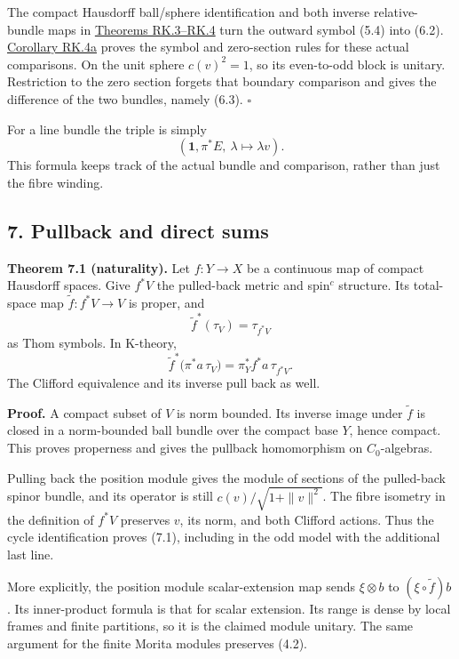 \documentclass[
  11pt,
]{article}
\begin{document}
The compact Hausdorff ball/sphere identification and both inverse
relative-bundle maps in
\href{supporting/relative-k-foundations/relative-k-foundations.html\#rk-difference}{Theorems
RK.3--RK.4} turn the outward symbol (5.4) into (6.2).
\href{supporting/relative-k-foundations/relative-k-foundations.html\#rk-symbol-rules}{Corollary
RK.4a} proves the symbol and zero-section rules for these actual
comparisons. On the unit sphere \(c(v)^2=1\), so its even-to-odd block
is unitary. Restriction to the zero section forgets that boundary
comparison and gives the difference of the two bundles, namely (6.3).
\(\square\)

For a line bundle the triple is simply \[
(\mathbf1,\pi^*E,\ \lambda\mapsto\lambda v).
\tag{6.4}
\] This formula keeps track of the actual bundle and comparison, rather
than just the fibre winding.

\subsection{7. Pullback and direct sums}\label{pullback-and-direct-sums}

\textbf{Theorem 7.1 (naturality).} Let \(f:Y\to X\) be a continuous map
of compact Hausdorff spaces. Give \(f^*V\) the pulled-back metric and
spin\(^{c}\) structure. Its total-space map \(\widetilde f:f^*V\to V\)
is proper, and \[
\widetilde f^*(\tau_V)=\tau_{f^*V}
\tag{7.1}
\] as Thom symbols. In K-theory, \[
\widetilde f^*\bigl(\pi^*a\,\tau_V\bigr)
 =\pi_Y^*f^*a\,\tau_{f^*V}.
\tag{7.2}
\] The Clifford equivalence and its inverse pull back as well.

\textbf{Proof.} A compact subset of \(V\) is norm bounded. Its inverse
image under \(\widetilde f\) is closed in a norm-bounded ball bundle
over the compact base \(Y\), hence compact. This proves properness and
gives the pullback homomorphism on \(C_0\)-algebras.

Pulling back the position module gives the module of sections of the
pulled-back spinor bundle, and its operator is still
\(c(v)/\sqrt{1+\|v\|^2}\). The fibre isometry in the definition of
\(f^*V\) preserves \(v\), its norm, and both Clifford actions. Thus the
cycle identification proves (7.1), including in the odd model with the
additional last line.

More explicitly, the position module scalar-extension map sends
\(\xi\otimes b\) to \((\xi\circ\widetilde f)b\). Its inner-product
formula is that for scalar extension. Its range is dense by local frames
and finite partitions, so it is the claimed module unitary. The same
argument for the finite Morita modules preserves (4.2).
\end{document}
